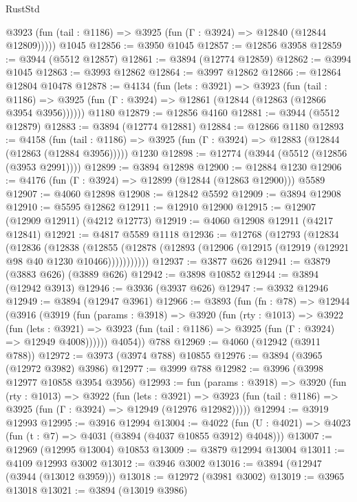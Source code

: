 \begin{lexlean}{RustStd}
\begin{coremodule}
      @3923 (fun (tail : @1186) => @3925 (fun (Γ : @3924) => @12840 (@12844 @12809)))))
    @1045
@12856 := @3950 @1045
@12857 := @12856 @3958
@12859 := @3944 (@5512 @12857)
@12861 := @3894 (@12774 @12859)
@12862 := @3994 @1045
@12863 := @3993 @12862
@12864 := @3997 @12862
@12866 := @12864 @12804 @10478
@12878 := @4134
    (fun (lets : @3921) =>
    @3923
      (fun (tail : @1186) =>
      @3925 (fun (Γ : @3924) => @12861 (@12844 (@12863 (@12866 @3954 @3956))))))
    @1180
@12879 := @12856 @4160
@12881 := @3944 (@5512 @12879)
@12883 := @3894 (@12774 @12881)
@12884 := @12866 @1180
@12893 := @4158
    (fun (tail : @1186) => @3925 (fun (Γ : @3924) => @12883 (@12844 (@12863 (@12884 @3956)))))
    @1230
@12898 := @12774 (@3944 (@5512 (@12856 (@3953 @2991))))
@12899 := @3894 @12898
@12900 := @12884 @1230
@12906 := @4176 (fun (Γ : @3924) => @12899 (@12844 (@12863 @12900))) @5589
@12907 := @4060 @12898
@12908 := @12842 @5592
@12909 := @3894 @12908
@12910 := @5595 @12862
@12911 := @12910 @12900
@12915 := @12907 (@12909 @12911) (@4212 @12773)
@12919 := @4060 @12908 @12911 (@4217 @12841)
@12921 := @4817 @5589 @1118
@12936 := @12768
    (@12793
      (@12834
        (@12836
          (@12838
            (@12855 (@12878 (@12893 (@12906 (@12915 (@12919 (@12921 @98 @40 @1230 @10466)))))))))))
@12937 := @3877 @626
@12941 := @3879 (@3883 @626) (@3889 @626)
@12942 := @3898 @10852
@12944 := @3894 (@12942 @3913)
@12946 := @3936 (@3937 @626)
@12947 := @3932 @12946
@12949 := @3894 (@12947 @3961)
@12966 := @3893
    (fun (fn : @78) =>
    @12944
      (@3916
        (@3919
          (fun (params : @3918) =>
          @3920
            (fun (rty : @1013) =>
            @3922
              (fun (lets : @3921) =>
              @3923 (fun (tail : @1186) => @3925 (fun (Γ : @3924) => @12949 @4008))))))
        @4054))
    @788
@12969 := @4060 (@12942 (@3911 @788))
@12972 := @3973 (@3974 @788) @10855
@12976 := @3894 (@3965 (@12972 @3982) @3986)
@12977 := @3999 @788
@12982 := @3996 (@3998 @12977 @10858 @3954 @3956)
@12993 := fun (params : @3918) =>
  @3920
    (fun (rty : @1013) =>
    @3922
      (fun (lets : @3921) =>
      @3923 (fun (tail : @1186) => @3925 (fun (Γ : @3924) => @12949 (@12976 @12982)))))
@12994 := @3919 @12993
@12995 := @3916 @12994
@13004 := @4022
    (fun (U : @4021) => @4023 (fun (t : @7) => @4031 (@3894 (@4037 @10855 @3912) @4048)))
@13007 := @12969 (@12995 @13004) @10853
@13009 := @3879 @12994 @13004
@13011 := @4109 @12993 @3002
@13012 := @3946 @3002
@13016 := @3894 (@12947 (@3944 (@13012 @3959)))
@13018 := @12972 (@3981 @3002)
@13019 := @3965 @13018
@13021 := @3894 (@13019 @3986)

\end{coremodule}
\end{lexlean}
